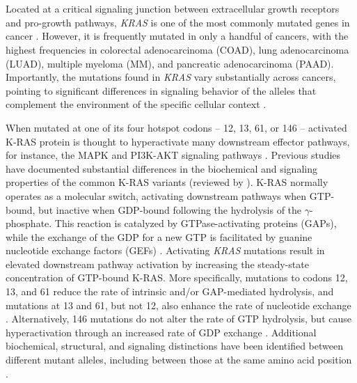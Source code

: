\documentclass[english, 10pt, letterpaper]{article}
\newcommand{\KRAS}{\emph{KRAS}}
\newcommand{\kras}{K-RAS}
\begin{document}
\section*{}

Located at a critical signaling junction between extracellular growth receptors and pro-growth pathways, \KRAS{} is one of the most commonly mutated genes in cancer \cite{Simanshu2017, Bailey2018}.
However, it is frequently mutated in only a handful of cancers, with the highest frequencies in colorectal adenocarcinoma (COAD), lung adenocarcinoma (LUAD), multiple myeloma (MM), and pancreatic adenocarcinoma (PAAD).
Importantly, the mutations found in \KRAS{} vary substantially across cancers, pointing to significant differences in signaling behavior of the alleles that complement the environment of the specific cellular context \cite{Haigis2017, Poulin2019}.

When mutated at one of its four hotspot codons – 12, 13, 61, or 146 – activated \kras{} protein is thought to hyperactivate many downstream effector pathways, for instance, the MAPK and PI3K-AKT signaling pathways \cite{Simanshu2017}.
Previous studies have documented substantial differences in the biochemical and signaling properties of the common \kras{} variants (reviewed by \cite{Miller2012, Li2018}).
\kras{} normally operates as a molecular switch, activating downstream pathways when GTP-bound, but inactive when GDP-bound following the hydrolysis of the $\gamma$-phosphate.
This reaction is catalyzed by GTPase-activating proteins (GAPs), while the exchange of the GDP for a new GTP is facilitated by guanine nucleotide exchange factors (GEFs) \cite{Barbacid1987}.
Activating \KRAS{} mutations result in elevated downstream pathway activation by increasing the steady-state concentration of GTP-bound \kras{}.
More specifically, mutations to codons 12, 13, and 61 reduce the rate of intrinsic and/or GAP-mediated hydrolysis, and mutations at 13 and 61, but not 12, also enhance the rate of nucleotide exchange \cite{Hunter2015a, Smith2013}.
Alternatively, 146 mutations do not alter the rate of GTP hydrolysis, but cause hyperactivation through an increased rate of GDP exchange \cite{Feig1988RelationshipProteins., Edkins2006, Janakiraman2010, Poulin2019}.
Additional biochemical, structural, and signaling distinctions have been identified between different mutant alleles, including between those at the same amino acid position \cite{Pershing2015, Hunter2015a, Poulin2019, Hobbs2019AtypicalCancer., Yuan2018, Kovalski2019, Ihle2012, Spoerner2004, Smith2014a, Pantsar2018}.
\end{document}
